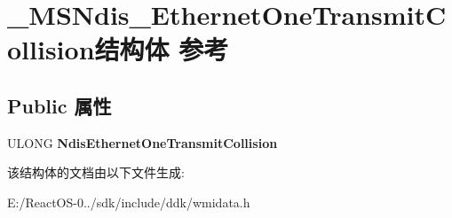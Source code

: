 \hypertarget{struct___m_s_ndis___ethernet_one_transmit_collision}{}\section{\+\_\+\+M\+S\+Ndis\+\_\+\+Ethernet\+One\+Transmit\+Collision结构体 参考}
\label{struct___m_s_ndis___ethernet_one_transmit_collision}
\subsection*{Public 属性}
\begin{DoxyCompactItemize}
\item 
\mbox{\label{struct___m_s_ndis___ethernet_one_transmit_collision_a456a401abff13ba7a39c58d7ebfbc273}} 
U\+L\+O\+NG {\bfseries Ndis\+Ethernet\+One\+Transmit\+Collision}
\end{DoxyCompactItemize}


该结构体的文档由以下文件生成\+:\begin{DoxyCompactItemize}
\item 
E\+:/\+React\+O\+S-\/0../sdk/include/ddk/wmidata.\+h\end{DoxyCompactItemize}
